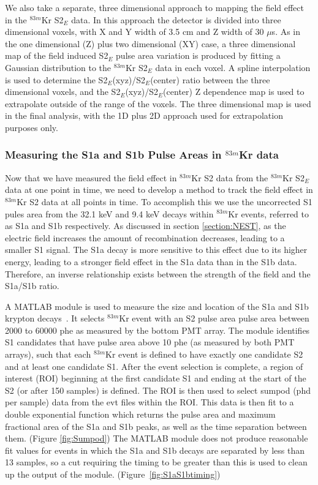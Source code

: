 We also take a separate, three dimensional approach to mapping the field effect in the $^{83m}$Kr S2$_E$ data. In this approach the detector is divided into three dimensional voxels, with X and Y width of 3.5 cm and Z width of 30 $\mu$s.  As in the one dimensional (Z) plus two dimensional (XY) case, a three dimensional map of the field induced S2$_E$ pulse area variation is produced by fitting a Gaussian distribution to the $^{83m}$Kr S2$_E$ data in each voxel.  A spline interpolation is used to determine the S2$_E$(xyz)/S2$_E$(center) ratio between the three dimensional voxels, and the S2$_E$(xyz)/S2$_E$(center) Z dependence map is used to extrapolate outside of the range of the voxels.  The three dimensional map is used in the final analysis, with the 1D plus 2D approach used for extrapolation purposes only.

\subsubsection{Measuring the S1a and S1b Pulse Areas in $^{83m}$Kr data} \label{section:S1aS1b1}

Now that we have measured the field effect in $^{83m}$Kr S2 data from the $^{83m}$Kr S2$_E$ data at one point in time, we need to develop a method to track the field effect in $^{83m}$Kr S2 data at all points in time.  To accomplish this we use the uncorrected S1 pules area from the 32.1 keV and 9.4 keV decays within $^{83m}$Kr events, referred to as S1a and S1b respectively.  As discussed in section \ref{section:NEST}, as the electric field increases the amount of recombination decreases, leading to a smaller S1 signal.  The S1a decay is more sensitive to this effect due to its higher energy, leading to a stronger field effect in the S1a data than in the S1b data.   Therefore, an inverse relationship exists between the strength of the field and the S1a/S1b ratio.  

A MATLAB module is used to measure the size and location of the S1a and S1b krypton decays~\cite{S1aS1bModuleNote}. It selects $^{83m}$Kr event with an S2 pulse area pulse area between 2000 to 60000 phe as measured by the bottom PMT array.  The module identifies S1 candidates that have pulse area above 10 phe (as measured by both PMT arrays), such that each $^{83m}$Kr event is defined to have exactly one candidate S2 and at least one candidate S1.  After the event selection is complete, a region of interest (ROI) beginning at the first candidate S1 and ending at the start of the S2 (or after 150 samples) is defined. The ROI is then used to select sumpod (phd per sample) data from the evt files within the ROI.  This data is then fit to a double exponential function which returns the pulse area and maximum fractional area of the S1a and S1b peaks, as well as the time separation between them. (Figure \ref{fig:Sumpod}) The MATLAB module does not produce reasonable fit values for events in which the S1a and S1b decays are separated by less than 13 samples, so a cut requiring the timing to be greater than this is used to clean up the output of the module.  (Figure~\ref{fig:S1aS1btiming})


